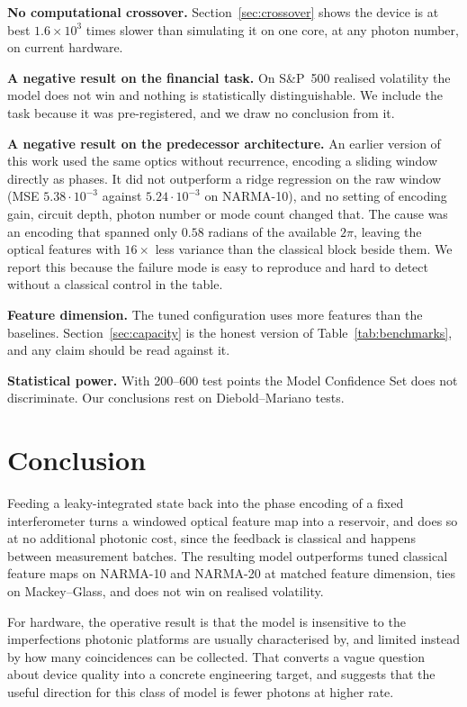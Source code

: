\documentclass[11pt]{article}
\begin{document}
\textbf{No computational crossover.} Section~\ref{sec:crossover} shows the device is at best
$1.6\times10^{3}$ times slower than simulating it on one core, at any photon number, on current
hardware.

\textbf{A negative result on the financial task.} On S\&P~500 realised volatility the model
does not win and nothing is statistically distinguishable. We include the task because it was
pre-registered, and we draw no conclusion from it.

\textbf{A negative result on the predecessor architecture.} An earlier version of this work
used the same optics without recurrence, encoding a sliding window directly as phases. It did
not outperform a ridge regression on the raw window (MSE $5.38\!\cdot\!10^{-3}$ against
$5.24\!\cdot\!10^{-3}$ on NARMA-10), and no setting of encoding gain, circuit depth, photon
number or mode count changed that. The cause was an encoding that spanned only $0.58$ radians
of the available $2\pi$, leaving the optical features with $16\times$ less variance than the
classical block beside them. We report this because the failure mode is easy to reproduce and
hard to detect without a classical control in the table.

\textbf{Feature dimension.} The tuned configuration uses more features than the baselines.
Section~\ref{sec:capacity} is the honest version of Table~\ref{tab:benchmarks}, and any claim
should be read against it.

\textbf{Statistical power.} With 200--600 test points the Model Confidence Set does not
discriminate. Our conclusions rest on Diebold--Mariano tests.

\section{Conclusion}\label{sec:conclusion}

Feeding a leaky-integrated state back into the phase encoding of a fixed interferometer turns a
windowed optical feature map into a reservoir, and does so at no additional photonic cost,
since the feedback is classical and happens between measurement batches. The resulting model
outperforms tuned classical feature maps on NARMA-10 and NARMA-20 at matched feature dimension,
ties on Mackey--Glass, and does not win on realised volatility.

For hardware, the operative result is that the model is insensitive to the imperfections
photonic platforms are usually characterised by, and limited instead by how many coincidences
can be collected. That converts a vague question about device quality into a concrete
engineering target, and suggests that the useful direction for this class of model is fewer
photons at higher rate.



\end{document}
